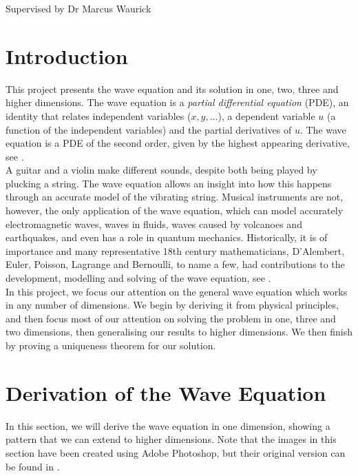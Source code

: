 \documentclass[a4paper, 12pt]{article}
\numberwithin{equation}{section}
\begin{document}
    \vspace*{5cm}
    Supervised by Dr Marcus Waurick
    \newpage
    \normalsize
    \tableofcontents
    \newpage

\section{Introduction}
This project presents the wave equation and its solution in one, two, three and
higher dimensions. The wave equation is a \emph{partial differential equation} (PDE),
an identity that relates independent variables ($x, y, ...$), a dependent variable
$u$ (a function of the independent variables) and the partial derivatives of
$u$. The wave equation is a PDE of the second order, given by the highest
appearing derivative, see \cite[Ch. 1, \S A]{Fol}. \\

A guitar and a violin make different sounds, despite both being played by
plucking a string. The wave equation allows an insight into how this happens
through an accurate model of the vibrating string. Musical instruments are not,
however, the  only application of the wave equation, which can model accurately
electromagnetic waves, waves in fluids, waves caused by volcanoes and
earthquakes, and even has a role in quantum mechanics. Historically, it is of
importance and many representative 18th century mathematicians, D'Alembert,
Euler, Poisson, Lagrange and Bernoulli, to name a few, had contributions to the
development, modelling and solving of the wave equation, see \cite{Coc}. \\

In this project, we focus our attention on the general wave equation which works
in any number of dimensions. We begin by deriving it from physical principles,
and then focus most of our attention on solving the problem in one, three and
two dimensions, then generalising our results to higher dimensions. We then finish by
proving a uniqueness theorem for our solution.

\section{Derivation of the Wave Equation}
In this section, we will derive the wave equation in one dimension, showing a
pattern that we can extend to higher dimensions. Note that the images in
this section have been created using Adobe Photoshop, but their original
version can be found in \cite[Ch. 12.2]{Kr}.
\end{document}
